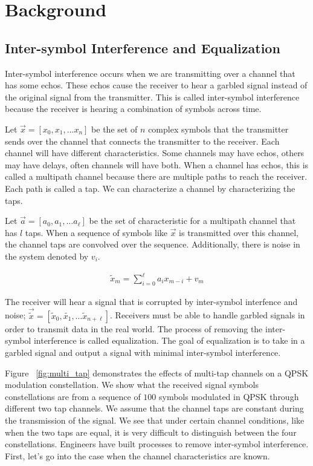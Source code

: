 \section{Background}

\subsection{Inter-symbol Interference and Equalization}

Inter-symbol interference occurs when we are transmitting over a channel that has some echos.  These echos cause the receiver to hear a garbled signal instead of the original signal from the transmitter.  This is called inter-symbol interference because the receiver is hearing a combination of symbols across time. 

Let $\vec{x}=[x_0, x_1, \ldots x_n]$ be the set of $n$ complex symbols that the transmitter sends over the channel that connects the transmitter to the receiver.
Each channel will have different characteristics. Some channels may have echos, others may have delays, often channels will have both.  When a channel has echos, this is called a multipath channel because there are multiple paths to reach the receiver.  Each path is called a tap.  We can characterize a channel by characterizing the taps.

Let $\vec{a} = [a_0, a_1, \ldots a_{\ell}]$ be the set of characteristic for a multipath channel that has $l$ taps. When a sequence of symbols like $\vec{x}$ is transmitted over this channel, the channel taps are convolved over the sequence.  Additionally, there is noise in the system denoted by $v_i$. 

\begin{align}
\tilde{x}_m = \sum_{i=0}^{\ell} a_i x_{m-i} + v_m
\end{align}

The receiver will hear a signal that is corrupted by inter-symbol interfence and noise;
$\vec{\tilde{x}}=[\tilde{x}_0, \tilde{x_1}, \ldots \tilde{x}_{n+\ell}]$. 
Receivers must be able to handle garbled signals in order to transmit data in the real world.  The process of removing the inter-symbol interference is called equalization.  The goal of equalization is to take in a garbled signal and output a signal with minimal inter-symbol interference. 

Figure ~\ref{fig:multi_tap} demonstrates the effects of multi-tap channels on a QPSK modulation constellation.  
We show what the received signal symbols constellations are from a sequence of $100$ symbols modulated in QPSK through different two tap channels.  We assume that the channel taps are constant during the transmission of the signal.
We see that under certain channel conditions, like when the two taps are equal, it is very difficult to distinguish between the four constellations.  
Engineers have built processes to remove inter-symbol interference.  First, let's go into the case when the channel characteristics are known.

